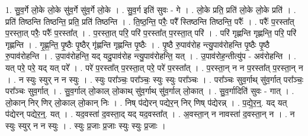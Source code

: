 \documentclass[17pt]{extarticle}
\begin{document}
1. सु॒व॒र्गे लो॒के लो॒के सु॑व॒र्गे सु॑व॒र्गे लो॒के । . सु॒व॒र्ग इति॑ सुवः - गे । . लो॒के प्रति॒ प्रति॑ लो॒के लो॒के प्रति॑ । . प्रति॑ तिष्ठन्ति तिष्ठन्ति॒ प्रति॒ प्रति॑ तिष्ठन्ति । . ति॒ष्ठ॒न्ति॒ परैः॒ परै᳚ स्तिष्ठन्ति तिष्ठन्ति॒ परैः᳚ । . परैः᳚ प॒रस्ता᳚त् प॒रस्ता॒त् परैः॒ परैः᳚ प॒रस्ता᳚त् । . प॒रस्ता॒त् परि॒ परि॑ प॒रस्ता᳚त् प॒रस्ता॒त् परि॑ । . परि॑ गृह्णन्ति गृह्णन्ति॒ परि॒ परि॑ गृह्णन्ति । . गृ॒ह्ण॒न्ति॒ पृ॒ष्ठैः पृ॒ष्ठैर् गृ॑ह्णन्ति गृह्णन्ति पृ॒ष्ठैः । . पृ॒ष्ठै रु॒पाव॑रोह न्त्यु॒पाव॑रोहन्ति पृ॒ष्ठैः पृ॒ष्ठै रु॒पाव॑रोहन्ति । . उ॒पाव॑रोहन्ति॒ यद् यदु॒पाव॑रोह न्त्यु॒पाव॑रोहन्ति॒ यत् । . उ॒पाव॑रोह॒न्तीत्यु॑प - अव॑रोहन्ति । . यत् परे॒ परे॒ यद् यत् परे᳚ । . परे॑ प॒रस्ता᳚त् प॒रस्ता॒त् परे॒ परे॑ प॒रस्ता᳚त् । . प॒रस्ता॒न् न न प॒रस्ता᳚त् प॒रस्ता॒न् न । . न स्युः स्युर् न न स्युः । . स्युः परा᳚ञ्चः॒ परा᳚ञ्चः॒ स्युः स्युः परा᳚ञ्चः । . परा᳚ञ्चः सुव॒र्गाथ् सु॑व॒र्गात् परा᳚ञ्चः॒ परा᳚ञ्चः सुव॒र्गात् । . सु॒व॒र्गाल् लो॒काल् लो॒काथ् सु॑व॒र्गाथ् सु॑व॒र्गाल् लो॒कात् । . सु॒व॒र्गादिति॑ सुवः - गात् । . लो॒कान् निर् णिर् लो॒काल् लो॒कान् निः । . निष् प॑द्येरन् पद्येर॒न् निर् णिष् प॑द्येरन्न् । . प॒द्ये॒र॒न्॒. यद् यत् प॑द्येरन् पद्येर॒न्॒. यत् । . यद॒वस्ता॑ द॒वस्ता॒द् यद् यद॒वस्ता᳚त् । . अ॒वस्ता॒न् न नावस्ता॑ द॒वस्ता॒न् न । . न स्युः स्युर् न न स्युः । . स्युः प्र॒जाः प्र॒जाः स्युः स्युः प्र॒जाः । \newline
\end{document}
